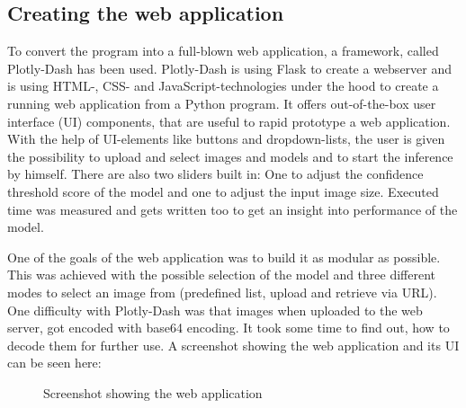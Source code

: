\subsection{Creating the web application}

To convert the program into a full-blown web application, a framework, called Plotly-Dash has been used. Plotly-Dash is using Flask to create a webserver and is using HTML-, CSS- and JavaScript-technologies under the hood to create a running web application from a Python program. It offers out-of-the-box user interface (UI) components, that are useful to rapid prototype a web application. With the help of UI-elements like buttons and dropdown-lists, the user is given the possibility to upload and select images and models and to start the inference by himself. There are also two sliders built in: One to adjust the confidence threshold score of the model and one to adjust the input image size. Executed time was measured and gets written too to get an insight into performance of the model.

One of the goals of the web application was to build it as modular as possible. This was achieved with the possible selection of the model and three different modes to select an image from (predefined list, upload and retrieve via URL). One difficulty with Plotly-Dash was that images when uploaded to the web server, got encoded with base64 encoding. It took some time to find out, how to decode them for further use. A screenshot showing the web application and its UI can be seen here:

 \begin{figure}[H]
	\caption{\label{fig:web-app-ui} Screenshot showing the web application}
\end{figure}

